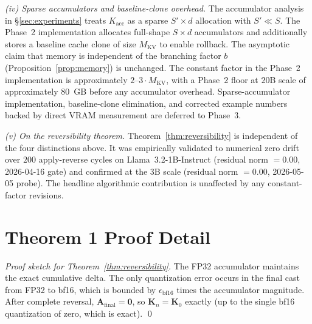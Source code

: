 \textit{(iv) Sparse accumulators and baseline-clone overhead.} The accumulator analysis in §\ref{sec:experiments} treats $K_{\text{acc}}$ as a sparse $S' \times d$ allocation with $S' \ll S$. The Phase~2 implementation allocates full-shape $S \times d$ accumulators and additionally stores a baseline cache clone of size $M_{\text{KV}}$ to enable rollback. The asymptotic claim that memory is independent of the branching factor $b$ (Proposition~\ref{prop:memory}) is unchanged. The constant factor in the Phase~2 implementation is approximately $2$--$3 \cdot M_{\text{KV}}$, with a Phase~2 floor at $20$B scale of approximately $80$~GB before any accumulator overhead. Sparse-accumulator implementation, baseline-clone elimination, and corrected example numbers backed by direct VRAM measurement are deferred to Phase~3.

\textit{(v) On the reversibility theorem.} Theorem~\ref{thm:reversibility} is independent of the four distinctions above. It was empirically validated to numerical zero drift over $200$ apply-reverse cycles on Llama~3.2-1B-Instruct (residual norm $= 0.00$, 2026-04-16 gate) and confirmed at the 3B scale (residual norm $= 0.00$, 2026-05-05 probe). The headline algorithmic contribution is unaffected by any constant-factor revisions.

\section{Theorem 1 Proof Detail}\label{sec:appendix-proof}

\begin{proof}[Proof sketch for Theorem~\ref{thm:reversibility}]
The FP32 accumulator maintains the exact cumulative delta. The only quantization error occurs in the final cast from FP32 to bf16, which is bounded by $\epsilon_{\text{bf16}}$ times the accumulator magnitude. After complete reversal, $\mathbf{A}_{\text{final}} = \mathbf{0}$, so $\mathbf{K}_n = \mathbf{K}_0$ exactly (up to the single bf16 quantization of zero, which is exact). \qed
\end{proof}

